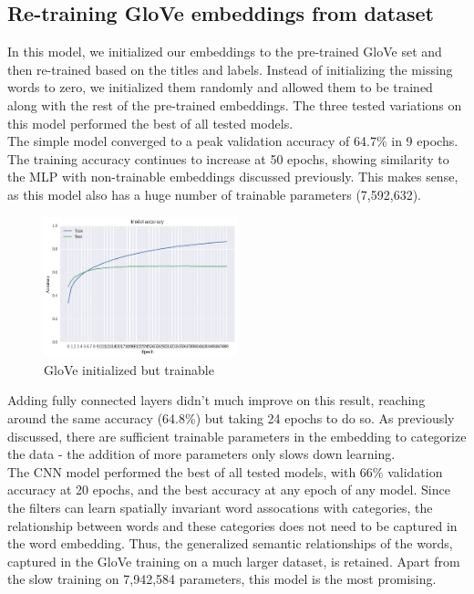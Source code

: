 \documentclass[jou,apacite, 10px]{apa6}
\begin{document}
\subsection{Re-training GloVe embeddings from dataset}
In this model, we initialized our embeddings to the pre-trained GloVe set and then re-trained based on the titles and labels. Instead of initializing the missing words to zero, we initialized them randomly and allowed them to be trained along with the rest of the pre-trained embeddings. The three tested variations on this model performed the best of all tested models.\\
The simple model converged to a peak validation accuracy of 64.7\% in 9 epochs. The training accuracy continues to increase at 50 epochs, showing similarity to the MLP with non-trainable embeddings discussed previously. This makes sense, as this model also has a huge number of trainable parameters (7,592,632).\\
\begin{figure}[h!]
    \centering
     \includegraphics[width=0.5\textwidth]{images/Training-GloveTrainable}
        \caption{GloVe initialized but trainable}
\end{figure}
Adding fully connected layers didn't much improve on this result, reaching around the same accuracy (64.8\%) but taking 24 epochs to do so. As previously discussed, there are sufficient trainable parameters in the embedding to categorize the data - the addition of more parameters only slows down learning.\\
The CNN model performed the best of all tested models, with 66\% validation accuracy at 20 epochs, and the best accuracy at any epoch of any model. Since the filters can learn spatially invariant word assocations with categories, the relationship between words and these categories does not need to be captured in the word embedding. Thus, the generalized semantic relationships of the words, captured in the GloVe training on a much larger dataset, is retained. Apart from the slow training on 7,942,584 parameters, this model is the most promising.\\
\end{document}
